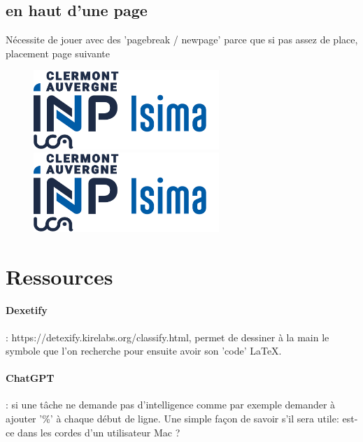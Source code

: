 \documentclass[12pt,a4paper]{article}
\begin{document}
		\subsection{en haut d'une page}
		Nécessite de jouer avec des 'pagebreak / newpage' parce que si pas assez de place, placement page suivante
		\begin{figure}[t]
			\includegraphics[height=30mm]{Image/Logo_ISIMA_INP.png}
			\hfill
			\includegraphics[height=30mm]{Image/Logo_ISIMA_INP.png}
			\\
			
		\end{figure}
		
	\section{Ressources}
	\paragraph{Dexetify} : https://detexify.kirelabs.org/classify.html, permet de dessiner à la main le symbole que l'on recherche pour ensuite avoir son 'code' LaTeX.
	\paragraph{ChatGPT} : si une tâche ne demande pas d'intelligence comme par exemple demander à ajouter '\%' à chaque début de ligne. Une simple façon de savoir s'il sera utile: est-ce dans les cordes d'un utilisateur Mac ?
\end{document}
